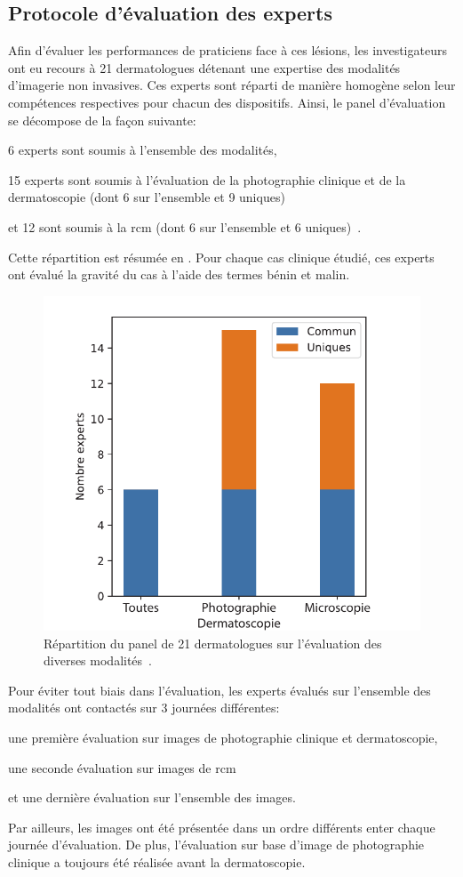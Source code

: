 \subsection{Protocole d'évaluation des experts}
Afin d'évaluer les performances de praticiens face à ces lésions, les investigateurs ont eu recours à 21 dermatologues détenant une expertise des modalités d'imagerie non invasives. Ces experts sont réparti de manière homogène selon leur compétences respectives pour chacun des dispositifs. Ainsi, le panel d'évaluation se décompose de la façon suivante: 
\begin{inlinerate}
\item 6 experts sont soumis à l'ensemble des modalités,
\item 15 experts sont soumis à l'évaluation de la photographie clinique et de la dermatoscopie (dont 6 sur l'ensemble et 9 uniques)
\item et 12 sont soumis à la \gls{rcm} (dont 6 sur l'ensemble et 6 uniques)~\cite{Cinotti2018}.
\end{inlinerate}
Cette répartition est résumée en . Pour chaque cas clinique étudié, ces experts ont évalué la gravité du cas à l'aide des termes bénin et malin.\par

\begin{figure}[H]
    \centering
    \includegraphics[width=0.6\linewidth]{contents/chapter_2/resources/experts_evaluation.pdf}
    \caption{Répartition du panel de 21 dermatologues sur l'évaluation des diverses modalités~\cite{Cinotti2018}.}
    \label{fig:experts_evaluation}
\end{figure}\par

Pour éviter tout biais dans l'évaluation, les experts évalués sur l'ensemble des modalités ont contactés sur 3 journées différentes: 
\begin{inlinerate}
\item une première évaluation sur images de photographie clinique et dermatoscopie,
\item une seconde évaluation sur images de \gls{rcm}
\item et une dernière évaluation sur l'ensemble des images.
\end{inlinerate}
Par ailleurs, les images ont été présentée dans un ordre différents enter chaque journée d'évaluation. De plus, l'évaluation sur base d'image de photographie clinique a toujours été réalisée avant la dermatoscopie.\par

